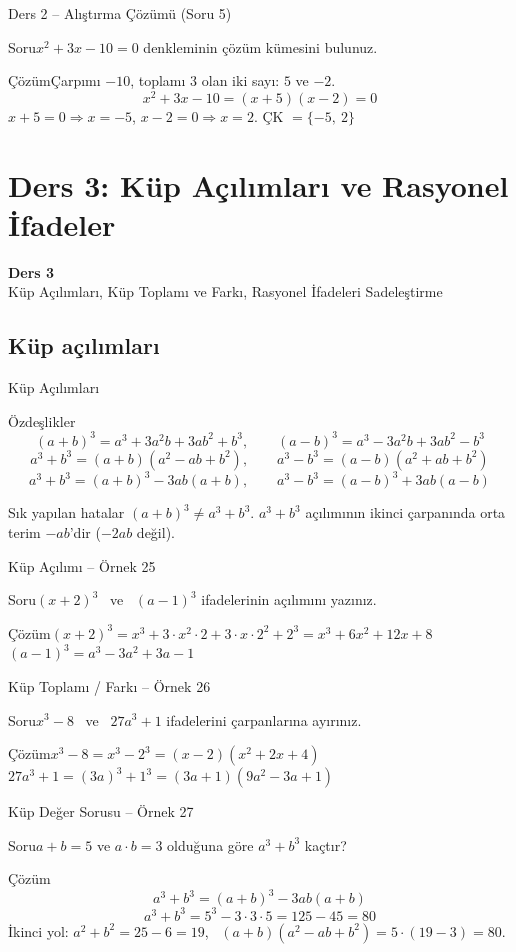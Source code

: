 \documentclass[aspectratio=169,11pt]{beamer}
\newcommand{\soru}[3]{%
\begin{frame}{#1}
  \begin{block}{Soru}\large #2\end{block}
  \pause
  \begin{exampleblock}{Çözüm}\large #3\end{exampleblock}
\end{frame}}
\begin{document}
\soru{Ders 2 -- Alıştırma Çözümü (Soru 5)}
{\(x^2+3x-10=0\) denkleminin çözüm kümesini bulunuz.}
{Çarpımı \(-10\), toplamı \(3\) olan iki sayı: \(5\) ve \(-2\).
\[x^2+3x-10=(x+5)(x-2)=0\]
\(x+5=0\Rightarrow x=-5\), \quad \(x-2=0\Rightarrow x=2\). \quad ÇK \(=\{-5,\ 2\}\)}


\section{Ders 3: Küp Açılımları ve Rasyonel İfadeler}
\begin{frame}
\centering\Large\color{anamavi}\textbf{Ders 3}\\[6pt]\normalsize Küp Açılımları, Küp Toplamı ve Farkı, Rasyonel İfadeleri Sadeleştirme
\end{frame}

\subsection{Küp açılımları}
\begin{frame}{Küp Açılımları}
\begin{block}{Özdeşlikler}
\[(a+b)^3=a^3+3a^2b+3ab^2+b^3,\qquad (a-b)^3=a^3-3a^2b+3ab^2-b^3\]
\[a^3+b^3=(a+b)(a^2-ab+b^2),\qquad a^3-b^3=(a-b)(a^2+ab+b^2)\]
\[a^3+b^3=(a+b)^3-3ab(a+b),\qquad a^3-b^3=(a-b)^3+3ab(a-b)\]
\end{block}
\begin{alertblock}{Sık yapılan hatalar}
\((a+b)^3\neq a^3+b^3\). \quad \(a^3+b^3\) açılımının ikinci çarpanında orta terim \(-ab\)'dir (\(-2ab\) değil).
\end{alertblock}
\end{frame}

\soru{Küp Açılımı -- Örnek 25}
{\((x+2)^3\) \ ve \ \((a-1)^3\) ifadelerinin açılımını yazınız.}
{\((x+2)^3=x^3+3\cdot x^2\cdot 2+3\cdot x\cdot 2^2+2^3=x^3+6x^2+12x+8\)\\[4pt]
\((a-1)^3=a^3-3a^2+3a-1\)}

\soru{Küp Toplamı / Farkı -- Örnek 26}
{\(x^3-8\) \ ve \ \(27a^3+1\) ifadelerini çarpanlarına ayırınız.}
{\(x^3-8=x^3-2^3=(x-2)(x^2+2x+4)\)\\[4pt]
\(27a^3+1=(3a)^3+1^3=(3a+1)(9a^2-3a+1)\)}

\soru{Küp Değer Sorusu -- Örnek 27}
{\(a+b=5\) ve \(a\cdot b=3\) olduğuna göre \(a^3+b^3\) kaçtır?}
{\[a^3+b^3=(a+b)^3-3ab(a+b)\]
\[a^3+b^3=5^3-3\cdot 3\cdot 5=125-45=80\]
İkinci yol: \(a^2+b^2=25-6=19\), \ \((a+b)(a^2-ab+b^2)=5\cdot(19-3)=80\).}
\end{document}
